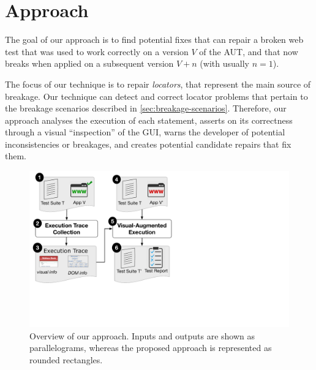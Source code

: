 \section{Approach}\label{sec:approach}

The goal of our approach is to find potential fixes that can repair a broken web test that was used to work correctly on a version $V$ of the AUT, and that now breaks when applied on a subsequent version $V+n$ (with usually $n=1$).

The focus of our technique is to repair \textit{locators}, that represent the main source of breakage.
Our technique can detect and correct locator problems that pertain to the breakage scenarios described in \autoref{sec:breakage-scenarios}.
Therefore, our approach analyses the execution of each statement,  asserts on its correctness through a visual ``inspection'' of the GUI, warns the developer of potential inconsistencies or breakages, and creates potential candidate repairs that fix them.

\begin{figure}[t]
\centering
\includegraphics[trim={0.2cm 6.5cm 17cm 0.2cm},clip,scale=0.28]{images/approach-bigger}
\caption{Overview of our approach. Inputs and outputs are shown as parallelograms, whereas the proposed approach is represented as rounded rectangles.}
\label{approach}
\end{figure}

